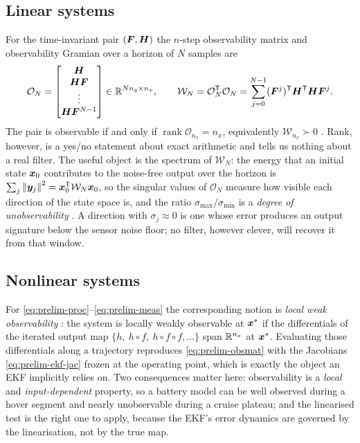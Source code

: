 \subsection{Linear systems}
For the time-invariant pair $(\bm{F},\bm{H})$ the $n$-step observability matrix and observability
Gramian over a horizon of $N$ samples are
\begin{equation}
\mathcal{O}_N = \begin{bmatrix}\bm{H}\\ \bm{H}\bm{F}\\ \vdots\\ \bm{H}\bm{F}^{N-1}\end{bmatrix}
\in\mathbb{R}^{N n_y\times n_x},
\qquad
\mathcal{W}_N = \mathcal{O}_N^{\mathsf{T}}\mathcal{O}_N = \sum_{j=0}^{N-1}(\bm{F}^{j})^{\mathsf{T}}\bm{H}^{\mathsf{T}}\bm{H}\bm{F}^{j}.
\label{eq:prelim-obsmat}
\end{equation}
The pair is observable if and only if $\operatorname{rank}\mathcal{O}_{n_x}=n_x$, equivalently
$\mathcal{W}_{n_x}\succ 0$ \cite{kalman1960controllability,chenct1999linear,kailath2000}. Rank,
however, is a yes/no statement about exact arithmetic and tells us nothing about a real filter.
The useful object is the spectrum of $\mathcal{W}_N$: the energy that an initial state
$\bm{x}_0$ contributes to the noise-free output over the horizon is
$\sum_{j}\left\lVert \bm{y}_j \right\rVert^2 = \bm{x}_0^{\mathsf{T}}\mathcal{W}_N\bm{x}_0$, so the singular values of
$\mathcal{O}_N$ measure how visible each direction of the state space is, and the ratio
$\sigma_{\max}/\sigma_{\min}$ is a \emph{degree of unobservability}
\cite{kreneride2009}. A direction with $\sigma_j \approx 0$ is one whose error produces an
output signature below the sensor noise floor; no filter, however clever, will recover it from
that window.

\subsection{Nonlinear systems}
For \eqref{eq:prelim-proc}--\eqref{eq:prelim-meas} the corresponding notion is \emph{local weak
observability} \cite{hermannkrener1977}: the system is locally weakly observable at $\bm{x}^\ast$ if
the differentials of the iterated output map
$\{h,\ h\circ f,\ h\circ f\circ f,\dots\}$ span $\mathbb{R}^{n_x}$ at $\bm{x}^\ast$. Evaluating those
differentials along a trajectory reproduces \eqref{eq:prelim-obsmat} with the Jacobians
\eqref{eq:prelim-ekf-jac} frozen at the operating point, which is exactly the object an EKF
implicitly relies on. Two consequences matter here: observability is a \emph{local} and
\emph{input-dependent} property, so a battery model can be well observed during a hover segment
and nearly unobservable during a cruise plateau; and the linearised test is the right one to
apply, because the EKF's error dynamics are governed by the linearisation, not by the true map.

